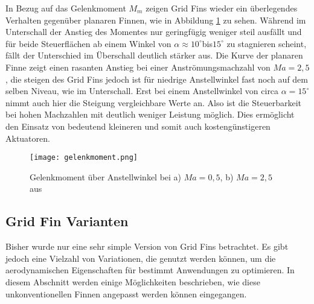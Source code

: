 In Bezug auf das Gelenkmoment $M_m$ zeigen Grid Fins wieder ein überlegendes Verhalten gegenüber planaren Finnen, wie in Abbildung \ref{abb_Mm-AoA} zu sehen. Während im Unterschall der Anstieg des Momentes nur geringfügig weniger steil ausfällt und für beide Steuerflächen ab einem Winkel von $\alpha \approx 10^\circ$bis$15^\circ$ zu stagnieren scheint, fällt der Unterschied im Überschall deutlich stärker aus. Die Kurve der planaren Finne zeigt einen rasanten Anstieg bei einer Anströmungsmachzahl von $Ma = 2,5$, die steigen des Grid Fins jedoch ist für niedrige Anstellwinkel fast noch auf dem selben Niveau, wie im Unterschall. Erst bei einem Anstellwinkel von circa $\alpha = 15^\circ$ nimmt auch hier die Steigung vergleichbare Werte an. Also ist die Steuerbarkeit bei hohen Machzahlen mit deutlich weniger Leistung möglich. Dies ermöglicht den Einsatz von bedeutend kleineren und somit auch kostengünstigeren Aktuatoren. 
\begin{figure}[h]
	\centering
	\texttt{[image: gelenkmoment.png]}
	\caption{Gelenkmoment über Anstellwinkel bei a) \ensuremath{Ma=0,5}, b) $Ma=2,5$ aus \cite{vergleichPlanar}}
	\label{abb_Mm-AoA}
\end{figure}


\subsection{Grid Fin Varianten}
Bisher wurde nur eine sehr simple Version von Grid Fins betrachtet. Es gibt jedoch eine Vielzahl von Variationen, die genutzt werden können, um die aerodynamischen Eigenschaften für bestimmt Anwendungen zu optimieren. In diesem Abschnitt werden einige Möglichkeiten beschrieben, wie diese unkonventionellen Finnen angepasst werden können eingegangen.
